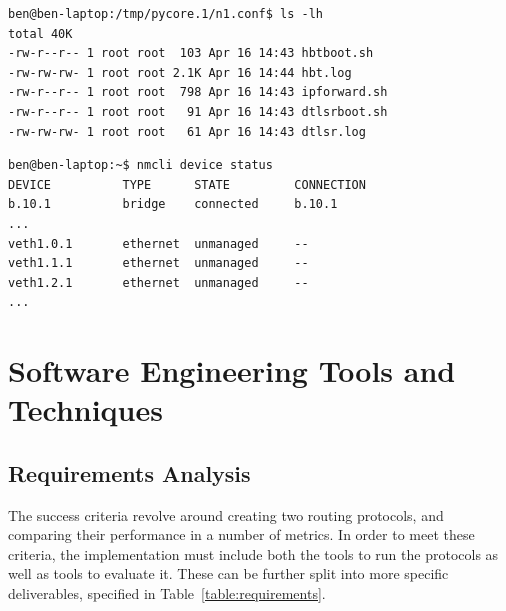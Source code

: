 \documentclass[withindex,glossary,openany]{cam-thesis}
\begin{document}
\begin{minipage}{1\textwidth} \centering
\begin{lstlisting}[label=core_filesystem, frame=tb, caption=Example of a virtualised file-system]
ben@ben-laptop:/tmp/pycore.1/n1.conf$ ls -lh
total 40K
-rw-r--r-- 1 root root  103 Apr 16 14:43 hbtboot.sh
-rw-rw-rw- 1 root root 2.1K Apr 16 14:44 hbt.log
-rw-r--r-- 1 root root  798 Apr 16 14:43 ipforward.sh
-rw-r--r-- 1 root root   91 Apr 16 14:43 dtlsrboot.sh
-rw-rw-rw- 1 root root   61 Apr 16 14:43 dtlsr.log
\end{lstlisting}
\end{minipage}

\begin{minipage}{1\textwidth} \centering
\begin{lstlisting}[label=core_interfaces, frame=tb, caption=Virtualised network interfaces and bridges]
ben@ben-laptop:~$ nmcli device status
DEVICE          TYPE      STATE         CONNECTION
b.10.1          bridge    connected     b.10.1
...
veth1.0.1       ethernet  unmanaged     --
veth1.1.1       ethernet  unmanaged     --
veth1.2.1       ethernet  unmanaged     --
...
\end{lstlisting}
\end{minipage}

\pagebreak

\section{Software Engineering Tools and Techniques}

\subsection{Requirements Analysis}

The success criteria revolve around creating two routing protocols, and comparing their performance in a number of metrics. In order to meet these criteria, the implementation must include both the tools to run the protocols as well as tools to evaluate it. These can be further split into more specific deliverables,
specified in Table~\ref{table:requirements}.
\end{document}
